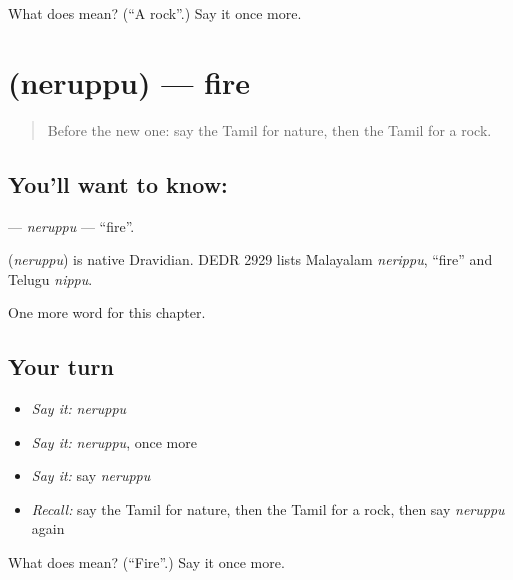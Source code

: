 \begin{tcolorbox}[breakable,colback=teal!4,colframe=teal!35!black,title={Before you move on}]
What does  mean? (\textquotedblleft{}A rock\textquotedblright{}.) Say it once more.
\end{tcolorbox}
\section[\texorpdfstring{\ta{நெருப்பு} (neruppu)}{நெருப்பு (neruppu)}]{ (neruppu) — fire}

\label{lesson:TA-C248-neruppu}



\begin{quote}
Before the new one: say the Tamil for nature, then the Tamil for a rock.
\end{quote}

\subsection*{You'll want to know: }
\textbf{} — \emph{neruppu} — \textquotedblleft{}fire\textquotedblright{}.

\begin{cousinweb}
\textbf{} (\emph{neruppu}) is native Dravidian. DEDR 2929 lists Malayalam \emph{nerippu}, \textquotedblleft{}fire\textquotedblright{} and Telugu \emph{nippu}.
\end{cousinweb}

\begin{grammarlens}[title={What you've built}]
One more word for this chapter.
\end{grammarlens}

\subsection*{Your turn}
\begin{itemize}
\raggedright
  \item \emph{Say it:} \emph{neruppu}
  \item \emph{Say it:} \emph{neruppu}, once more
  \item \emph{Say it:} say \emph{neruppu}
  \item \emph{Recall:} say the Tamil for nature, then the Tamil for a rock, then say \emph{neruppu} again
\end{itemize}

\begin{tcolorbox}[breakable,colback=teal!4,colframe=teal!35!black,title={Before you move on}]
What does  mean? (\textquotedblleft{}Fire\textquotedblright{}.) Say it once more.
\end{tcolorbox}
